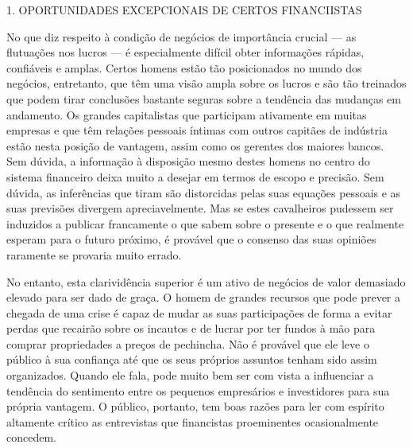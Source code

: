 \documentclass[12pt]{article}
\begin{document}
1. OPORTUNIDADES EXCEPCIONAIS DE CERTOS FINANCIISTAS

No que diz respeito à condição de negócios de importância crucial — as flutuações nos lucros — é especialmente difícil obter informações rápidas, confiáveis e amplas. Certos homens estão tão posicionados no mundo dos negócios, entretanto, que têm uma visão ampla sobre os lucros e são tão treinados que podem tirar conclusões bastante seguras sobre a tendência das mudanças em andamento. Os grandes capitalistas que participam ativamente em muitas empresas e que têm relações pessoais íntimas com outros capitães de indústria estão nesta posição de vantagem, assim como os gerentes dos maiores bancos. Sem dúvida, a informação à disposição mesmo destes homens no centro do sistema financeiro deixa muito a desejar em termos de escopo e precisão. Sem dúvida, as inferências que tiram são distorcidas pelas suas equações pessoais e as suas previsões divergem apreciavelmente. Mas se estes cavalheiros pudessem ser induzidos a publicar francamente o que sabem sobre o presente e o que realmente esperam para o futuro próximo, é provável que o consenso das suas opiniões raramente se provaria muito errado.

No entanto, esta clarividência superior é um ativo de negócios de valor demasiado elevado para ser dado de graça. O homem de grandes recursos que pode prever a chegada de uma crise é capaz de mudar as suas participações de forma a evitar perdas que recairão sobre os incautos e de lucrar por ter fundos à mão para comprar propriedades a preços de pechincha. Não é provável que ele leve o público à sua confiança até que os seus próprios assuntos tenham sido assim organizados. Quando ele fala, pode muito bem ser com vista a influenciar a tendência do sentimento entre os pequenos empresários e investidores para sua própria vantagem. O público, portanto, tem boas razões para ler com espírito altamente crítico as entrevistas que financistas proeminentes ocasionalmente concedem.
\end{document}
